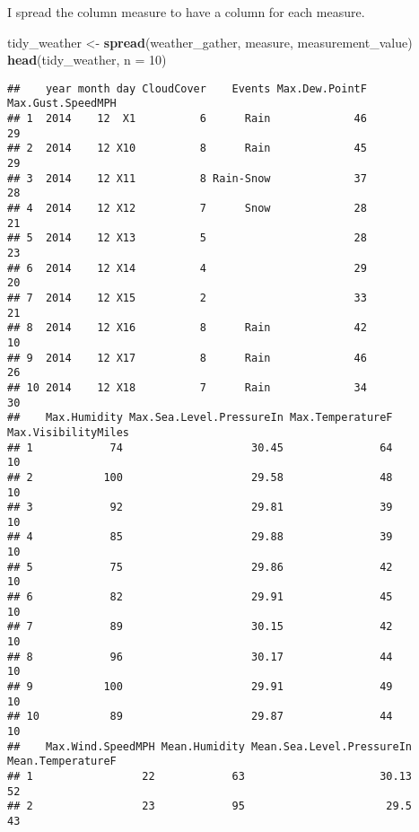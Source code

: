 \documentclass[
]{article}
\newenvironment{Shaded}{\begin{snugshade}}{\end{snugshade}}
\newcommand{\DataTypeTok}[1]{\textcolor[rgb]{0.13,0.29,0.53}{#1}}
\newcommand{\DecValTok}[1]{\textcolor[rgb]{0.00,0.00,0.81}{#1}}
\newcommand{\KeywordTok}[1]{\textcolor[rgb]{0.13,0.29,0.53}{\textbf{#1}}}
\newcommand{\NormalTok}[1]{#1}
\newcommand{\StringTok}[1]{\textcolor[rgb]{0.31,0.60,0.02}{#1}}
\begin{document}
I spread the column measure to have a column for each measure.

\begin{Shaded}
\begin{Highlighting}[]
\NormalTok{tidy_weather <-}\StringTok{ }\KeywordTok{spread}\NormalTok{(weather_gather, measure, measurement_value)}
\KeywordTok{head}\NormalTok{(tidy_weather, }\DataTypeTok{n =} \DecValTok{10}\NormalTok{)}
\end{Highlighting}
\end{Shaded}

\begin{verbatim}
##    year month day CloudCover    Events Max.Dew.PointF Max.Gust.SpeedMPH
## 1  2014    12  X1          6      Rain             46                29
## 2  2014    12 X10          8      Rain             45                29
## 3  2014    12 X11          8 Rain-Snow             37                28
## 4  2014    12 X12          7      Snow             28                21
## 5  2014    12 X13          5                       28                23
## 6  2014    12 X14          4                       29                20
## 7  2014    12 X15          2                       33                21
## 8  2014    12 X16          8      Rain             42                10
## 9  2014    12 X17          8      Rain             46                26
## 10 2014    12 X18          7      Rain             34                30
##    Max.Humidity Max.Sea.Level.PressureIn Max.TemperatureF Max.VisibilityMiles
## 1            74                    30.45               64                  10
## 2           100                    29.58               48                  10
## 3            92                    29.81               39                  10
## 4            85                    29.88               39                  10
## 5            75                    29.86               42                  10
## 6            82                    29.91               45                  10
## 7            89                    30.15               42                  10
## 8            96                    30.17               44                  10
## 9           100                    29.91               49                  10
## 10           89                    29.87               44                  10
##    Max.Wind.SpeedMPH Mean.Humidity Mean.Sea.Level.PressureIn Mean.TemperatureF
## 1                 22            63                     30.13                52
## 2                 23            95                      29.5                43

\end{verbatim}
\end{document}
